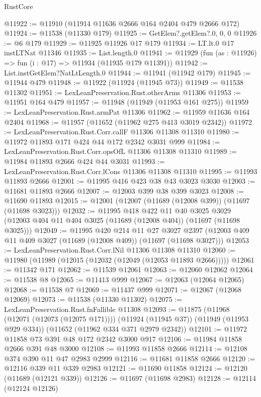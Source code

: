 \begin{lexlean}{RustCore}
\begin{coremodule}
@11922 := @11910 (@11914 @11636 @2666 @164 @2404 @479 @2666 @172)
@11924 := @11538 (@11330 @179)
@11925 := GetElem?.getElem?.{0, 0, 0}
@11926 := @6 @179
@11929 := @11925 @11926 @17 @179
@11934 := LT.lt.{0} @17 instLTNat @11346
@11935 := List.length.{0}
@11941 := @11929 (fun (as : @11926) => fun (i : @17) => @11934 (@11935 @179 @11391))
@11942 := List.instGetElem?NatLtLength.{0}
@11944 := @11941 (@11942 @179)
@11945 := @11944 @479
@11948 := @11922 (@11924 (@11945 @73))
@11949 := @11538 @11302
@11951 := LexLeanPreservation.Rust.otherArms @11306
@11953 := @11951 @164 @479
@11957 := @11948 (@11949 (@11953 @161 @275))
@11959 := LexLeanPreservation.Rust.armPat @11306
@11962 := @11959 @11636 @164 @2404
@11968 := @11957 (@11652 (@11962 @275 @413 @3019 @2342))
@11972 := LexLeanPreservation.Rust.Corr.callF @11306 @11308 @11310
@11980 := @11972 @11893 @171 @424 @44 @172 @2342 @3031 @999
@11984 := LexLeanPreservation.Rust.Corr.opsOfL @11306 @11308 @11310
@11989 := @11984 @11893 @2666 @424 @44 @3031
@11993 := LexLeanPreservation.Rust.Corr.lCons @11306 @11308 @11310
@11995 := @11993 @11893 @2666
@12001 := @11995 @416 @423 @38 @43 @3023 @3030
@12003 := @11681 @11893 @2666
@12007 := @12003 @399 @38 @399 @3023
@12008 := @11690 @11893
@12015 := @12001 (@12007 (@11689 (@12008 @399)) (@11697 (@11698 @3023)))
@12032 := @11995
    @418
    @422
    @11
    @40
    @3025
    @3029
    (@12003 @404 @11 @404 @3025 (@11689 (@12008 @404)) (@11697 (@11698 @3025)))
@12049 := @11995
    @420
    @214
    @11
    @27
    @3027
    @2397
    (@12003 @409 @11 @409 @3027 (@11689 (@12008 @409)) (@11697 (@11698 @3027)))
@12053 := LexLeanPreservation.Rust.Corr.lNil @11306 @11308 @11310
@12060 := @11980 (@11989 (@12015 (@12032 (@12049 (@12053 @11893 @2666)))))
@12061 := @11342 @171
@12062 := @11539 @12061
@12063 := @12060 @12062
@12064 := @11538 @8
@12065 := @11413 @999
@12067 := @12063 (@12064 @12065)
@12068 := @11538 @7
@12069 := @11437 @999
@12071 := @12067 (@12068 @12069)
@12073 := @11538 (@11330 @11302)
@12075 := LexLeanPreservation.Rust.fnFallible @11308
@12093 := @11875
    (@11968 (@12071 (@12073 (@12075 @171))))
    (@11924 (@11945 @37))
    (@11949 (@11953 @929 @334))
    (@11652 (@11962 @334 @371 @2979 @2342))
@12101 := @11972 @11858 @73 @391 @48 @172 @2342 @3000 @917
@12106 := @11984 @11858 @2666 @391 @48 @3000
@12108 := @11993 @11858 @2666
@12114 := @12108 @374 @390 @11 @47 @2983 @2999
@12116 := @11681 @11858 @2666
@12120 := @12116 @339 @11 @339 @2983
@12121 := @11690 @11858
@12124 := @12120 (@11689 (@12121 @339))
@12126 := @11697 (@11698 @2983)
@12128 := @12114 (@12124 @12126)

\end{coremodule}
\end{lexlean}
